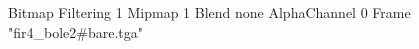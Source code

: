 {Bitmap
	{Filtering 1}
	{Mipmap 1}
	{Blend none}
	{AlphaChannel 0}
	{Frame "fir4_bole2#bare.tga"}
}
